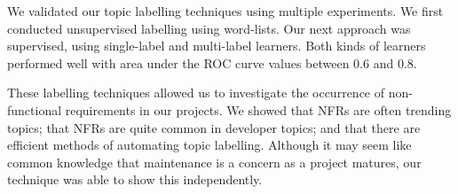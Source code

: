 \documentclass[]{sig-alternate}
\begin{document}
We validated our topic labelling techniques using multiple experiments. 
We first conducted unsupervised labelling using word-lists. 
Our next approach was supervised, using single-label and multi-label learners. 
Both kinds of learners performed well with area under the ROC curve values between $0.6$ and $0.8$.

These labelling techniques allowed us to investigate the occurrence of non-functional requirements in our projects.
We showed that NFRs are often trending topics; that NFRs are quite common in developer topics; and that there are efficient methods of automating topic labelling.
Although it may seem like common knowledge that maintenance is a concern as a project matures, our technique was able to show this independently.



\end{document}
